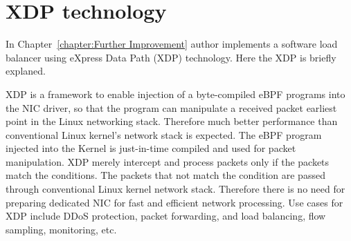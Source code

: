 \FloatBarrier

\section{XDP technology}

In Chapter~\ref{chapter:Further Improvement}  author implements a software load balancer using eXpress Data Path (XDP) \cite{hoiland2018express} technology.
Here the XDP is briefly explaned.

XDP is a framework to enable injection of a byte-compiled eBPF programs into the NIC driver, so that the program can manipulate a received packet  earliest point in the Linux networking stack.
Therefore much better performance than conventional Linux kernel's network stack is expected.
The eBPF program injected into the Kernel is just-in-time compiled and used for packet manipulation.
XDP merely intercept and process packets only if the packets match the conditions.
The packets that  not match the condition are passed through conventional Linux kernel network stack.
Therefore there is no need for preparing dedicated NIC for fast and efficient network processing.
Use cases for XDP include DDoS protection, packet forwarding, and load balancing, flow sampling, monitoring, etc.

